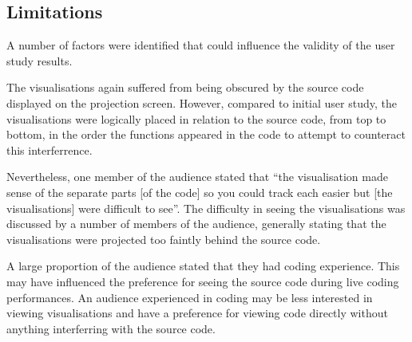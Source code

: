 




\subsection{Limitations}

A number of factors were identified that could influence the validity of the user study results.

The visualisations again suffered from being obscured by the source code displayed on the projection screen. However, compared to initial user study, the visualisations were logically placed in relation to the source code, from top to bottom, in the order the functions appeared in the code to attempt to counteract this interferrence.

Nevertheless, one member of the audience stated that ``the visualisation made sense of the separate parts [of the code] so you could track each easier but [the visualisations] were difficult to see''. The difficulty in seeing the visualisations was discussed by a number of members of the audience, generally stating that the visualisations were projected too faintly behind the source code.


A large proportion of the audience stated that they had coding experience. This may have influenced the preference for seeing the source code during live coding performances. An audience experienced in coding may be less interested in viewing visualisations and have a preference for viewing code directly without anything interferring with the source code.

